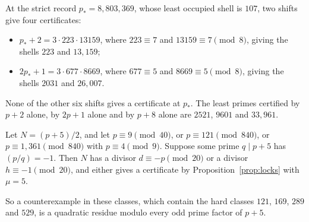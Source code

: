 At the strict record $p_*=8{,}803{,}369$, whose least occupied shell is $107$, two shifts give four certificates:
\begin{itemize}
\item $p_*+2=3\cdot223\cdot13159$, where $223\equiv7$ and $13159\equiv7\pmod8$, giving the shells $223$ and $13{,}159$;
\item $2p_*+1=3\cdot677\cdot8669$, where $677\equiv5$ and $8669\equiv5\pmod8$, giving the shells $2031$ and $26{,}007$.
\end{itemize}
None of the other six shifts gives a certificate at $p_*$. The least primes certified by $p+2$ alone, by $2p+1$ alone and by $p+8$ alone are $2521$, $9601$ and $33{,}961$.

\begin{theorem}[$p+5$]\label{thm:pplus5}
Let $N=(p+5)/2$, and let $p\equiv9\pmod{40}$, or $p\equiv121\pmod{840}$, or $p\equiv1,361\pmod{840}$ with $p\equiv4\pmod9$. Suppose some prime $q\mid p+5$ has $(p/q)=-1$. Then $N$ has a divisor $d\equiv-p\pmod{20}$ or a divisor $h\equiv-1\pmod{20}$, and either gives a certificate by Proposition~\ref{prop:locks} with $\mu=5$.

So a counterexample in these classes, which contain the hard classes $121$, $169$, $289$ and $529$, is a quadratic residue modulo every odd prime factor of $p+5$.
\end{theorem}
